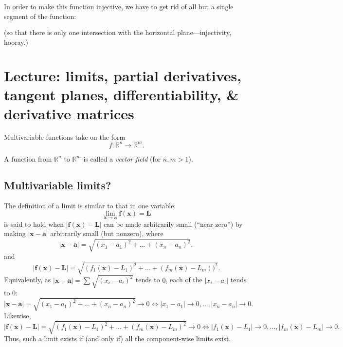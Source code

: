 \documentclass[11pt]{article}
\newcommand{\uvec}[1]{\mathbf{\hat{#1}}}
\renewcommand{\vec}[1]{\mathbf{#1}}
\begin{document}
In order to make this function injective, we have to get rid of all but a single segment of the function:
\begin{center}
\end{center}
(so that there is only one intersection with the horizontal plane---injectivity, hooray.)


\section*{Lecture: limits, partial derivatives, tangent planes, differentiability, \& derivative matrices}

Multivariable functions take on the form
\[
    f: \mathbb R^n \to \mathbb R^m.
\]

A function from \(\mathbb R^n\) to \(\mathbb R^m\) is called a \emph{vector field} (for \(n, m > 1\)).


%



\subsection*{Multivariable limits?} The definition of a limit is similar to that in one variable:
\[
    \lim_{\vec x \to \vec a} \vec f(\vec x) = \vec L
\]
is said to hold when \(|\vec f(\vec x) - \vec L|\) can be made arbitrarily small (``near zero'') by making \(|\vec x - \vec a|\) arbitrarily small (but nonzero), where
\[
    |\vec x - \vec a| = \sqrt{(x_1 - a_1)^2 + \dots + (x_n - a_n)^2},
\]
and
\[
    |\vec f(\vec x) - \vec L| = \sqrt{(f_1(\vec x) - L_1)^2 + \dots + (f_m(\vec x) - L_m))^2}.
\]
Equivalently, as \(|\vec x - \vec a| = \sum \sqrt{(x_i - a_i)^2}\) tends to \(0\), each of the \(|x_i - a_i|\) tends to \(0\):
\[
    |\vec x - \vec a| = \sqrt{(x_1 - a_1)^2 + \dots + (x_n - a_n)^2} \to 0 \iff |x_1 - a_1| \to 0, \dots, |x_n - a_n| \to 0.
\]
Likewise,
\[
    |\vec f(\vec x) - \vec L| = \sqrt{(f_1(\vec x) - L_1)^2 + \dots + (f_m(\vec x) - L_m)^2} \to 0 \iff |f_1(\vec x) - L_1| \to 0, \dots, |f_m(\vec x) - L_m| \to 0.
\]
Thus, such a limit exists if (and only if) all the component-wise limits exist.
\end{document}
